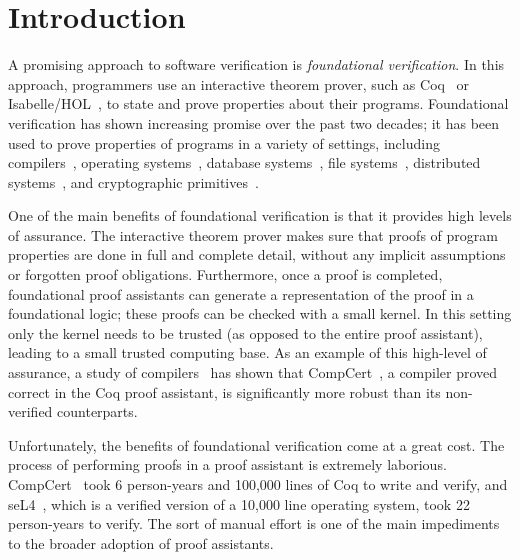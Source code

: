 \documentclass[sigplan,screen]{acmart}
\renewcommand{\>}{\quad}
\newcommand{\cut}[1]{}
\begin{document}



\maketitle

\section{Introduction}
\label{sec:introduction}

A promising approach to software verification is \emph{foundational
  verification}. In this approach, programmers use an interactive
theorem prover, such as Coq~\cite{coq} or
Isabelle/HOL~\cite{isabelle}, to state and prove properties about
their programs. \cut{The proofs are performed interactively via the use of
\emph{proof commands}, which programmers invoke to make progress on a
proof. To complete a proof, a programmer must provide guidance to the
proof assistant at each step by picking which proof command to
apply.} Foundational verification has shown increasing promise over the
past two decades; it has been used to prove properties of programs in
a variety of settings, including compilers~\cite{compcert}, operating
systems~\cite{sel4}, database systems~\cite{verified-db}, file
systems~\cite{verified-fs}, distributed systems~\cite{verdi}, and
cryptographic primitives~\cite{appel-sha}.

One of the main benefits of foundational verification is that it
provides high levels of assurance. The interactive theorem prover
makes sure that proofs of program properties are done in full and
complete detail, without any implicit assumptions or forgotten proof
obligations. Furthermore, once a proof is completed, foundational
proof assistants can generate a representation of the proof in a
foundational logic; these proofs can be checked with a small
kernel. In this setting only the kernel needs to be trusted (as
opposed to the entire proof assistant), leading to a small trusted
computing base. As an example of this high-level of assurance, a study
of compilers~\cite{csmith} has shown that CompCert~\cite{compcert}, a
compiler proved correct in the Coq proof assistant, is significantly
more robust than its non-verified counterparts.

Unfortunately, the benefits of foundational verification come at a
great cost. The process of performing proofs in a proof assistant is
extremely laborious. CompCert~\cite{compcert} took 6 person-years and
100,000 lines of Coq to write and verify, and seL4~\cite{sel4}, which
is a verified version of a 10,000 line operating system, took 22
person-years to verify. The sort of manual effort is one of the main
impediments to the broader adoption of proof assistants.
\end{document}
